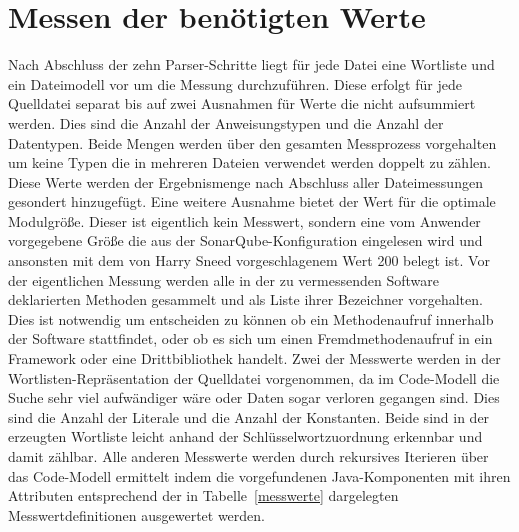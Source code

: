 \documentclass[gb,ngerman]{stthesis}
\begin{document}
		\section{Messen der benötigten Werte}
			Nach Abschluss der zehn Parser-Schritte liegt für jede Datei eine Wortliste und ein Dateimodell vor um die Messung durchzuführen. Diese erfolgt für jede Quelldatei separat bis auf zwei Ausnahmen für Werte die nicht aufsummiert werden. Dies sind die Anzahl der Anweisungstypen und die Anzahl der Datentypen. Beide Mengen werden über den gesamten Messprozess vorgehalten um keine Typen die in mehreren Dateien verwendet werden doppelt zu zählen. Diese Werte werden der Ergebnismenge nach Abschluss aller Dateimessungen gesondert hinzugefügt. Eine weitere Ausnahme bietet der Wert für die optimale Modulgröße. Dieser ist eigentlich kein Messwert, sondern eine vom Anwender vorgegebene Größe die aus der SonarQube-Konfiguration eingelesen wird und ansonsten mit dem von Harry Sneed vorgeschlagenem Wert 200 belegt ist.\newline
			Vor der eigentlichen Messung werden alle in der zu vermessenden Software deklarierten Methoden gesammelt und als Liste ihrer Bezeichner vorgehalten. Dies ist notwendig um entscheiden zu können ob ein Methodenaufruf innerhalb der Software stattfindet, oder ob es sich um einen Fremdmethodenaufruf in ein Framework oder eine Drittbibliothek handelt. \newline
			Zwei der Messwerte werden in der Wortlisten-Repräsentation der Quelldatei vorgenommen, da im Code-Modell die Suche sehr viel aufwändiger wäre oder Daten sogar verloren gegangen sind. Dies sind die Anzahl der Literale und die Anzahl der Konstanten. Beide sind in der erzeugten Wortliste leicht anhand der Schlüsselwortzuordnung erkennbar und damit zählbar. \newline
			Alle anderen Messwerte werden durch rekursives Iterieren über das Code-Modell ermittelt indem die vorgefundenen Java-Komponenten mit ihren Attributen entsprechend der in Tabelle~\ref{messwerte} dargelegten Messwertdefinitionen ausgewertet werden. 
\end{document}
